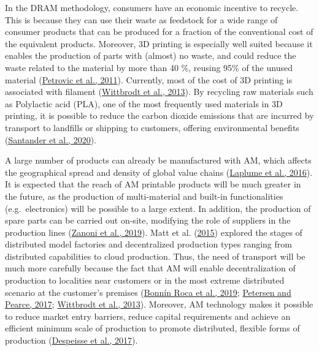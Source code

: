 \documentclass[
  11pt,
]{article}
\begin{document}
In the DRAM methodology, consumers have an economic incentive to
recycle. This is because they can use their waste as feedstock for a
wide range of consumer products that can be produced for a fraction of
the conventional cost of the equivalent products. Moreover, 3D printing
is especially well suited because it enables the production of parts
with (almost) no waste, and could reduce the waste related to the
material by more than 40 \%, reusing 95\% of the unused material
(\protect\hyperlink{ref-Petrovic2011}{Petrovic et al., 2011}).
Currently, most of the cost of 3D printing is associated with filament
(\protect\hyperlink{ref-Wittbrodt2013}{Wittbrodt et al., 2013}). By
recycling raw materials such as Polylactic acid (PLA), one of the most
frequently used materials in 3D printing, it is possible to reduce the
carbon dioxide emissions that are incurred by transport to landfills or
shipping to customers, offering environmental benefits
(\protect\hyperlink{ref-Santander2020}{Santander et al., 2020}).

A large number of products can already be manufactured with AM, which
affects the geographical spread and density of global value chains
(\protect\hyperlink{ref-Laplume2016}{Laplume et al., 2016}). It is
expected that the reach of AM printable products will be much greater in
the future, as the production of multi-material and built-in
functionalities (e.g.~electronics) will be possible to a large extent.
In addition, the production of spare parts can be carried out on-site,
modifying the role of suppliers in the production lines
(\protect\hyperlink{ref-Zanoni2019}{Zanoni et al., 2019}). Matt et al.
(\protect\hyperlink{ref-Matt2015}{2015}) explored the stages of
distributed model factories and decentralized production types ranging
from distributed capabilities to cloud production. Thus, the need of
transport will be much more carefully because the fact that AM will
enable decentralization of production to localities near customers or in
the most extreme distributed scenario at the customer's premises
(\protect\hyperlink{ref-BonninRoca2019}{Bonnín Roca et al., 2019};
\protect\hyperlink{ref-Petersen2017a}{Petersen and Pearce, 2017};
\protect\hyperlink{ref-Wittbrodt2013}{Wittbrodt et al., 2013}).
Moreover, AM technology makes it possible to reduce market entry
barriers, reduce capital requirements and achieve an efficient minimum
scale of production to promote distributed, flexible forms of production
(\protect\hyperlink{ref-Despeisse2016}{Despeisse et al., 2017}).
\end{document}

